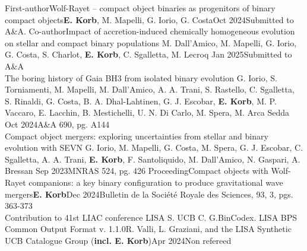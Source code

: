 %
%
%

\begin{experiences}
    \publicationtags
    {First-author}{Wolf-Rayet -- compact object binaries as progenitors of binary compact objects}{\textbf{E. Korb}, M. Mapelli, G. Iorio, G. Costa}{Oct 2024}{Submitted to A\&A.}{}
    \emptySeparator
    \publicationtags
    {Co-author}{Impact of accretion-induced chemically homogeneous evolution on stellar and compact binary populations}
    {M. Dall'Amico, M. Mapelli, G. Iorio, G. Costa, S. Charlot, \textbf{E. Korb}, C. Sgalletta, M. Lecroq}
    {Jan 2025}{Submitted to A\&A}
    {} 
    \\
    \medskip
    \publicationtags
    {}{The boring history of Gaia BH3 from isolated binary evolution}
    {G. Iorio, S. Torniamenti, M. Mapelli, M. Dall'Amico, A. A. Trani, S. Rastello, C. Sgalletta, S. Rinaldi, G. Costa, B. A. Dhal-Lahtinen, G. J. Escobar, \textbf{E. Korb}, M. P. Vaccaro, E. Lacchin, B. Mestichelli, U. N. Di Carlo, M. Spera, M. Arca Sedda}
    {Oct 2024}{A\&A 690, pg. A144}
    {} 
    \\
    \medskip
    \publicationtags
    {}{Compact object mergers: exploring uncertainties from stellar and binary evolution with SEVN}
    {G. Iorio, M. Mapelli, G. Costa, M. Spera, G. J. Escobar, C. Sgalletta, A. A. Trani, \textbf{E. Korb}, F. Santoliquido, M. Dall'Amico, N. Gaspari, A. Bressan}
    {Sep 2023}{MNRAS 524, pg. 426}
    {}    
    \emptySeparator
    \publicationtags
    {Proceeding}{Compact objects with Wolf-Rayet companions: a key binary configuration to produce gravitational wave mergers}{\textbf{E. Korb}}{Dec 2024}{Bulletin de la Société Royale des Sciences, 93, 3, pgs. 363-373 \\ Contribution to 41st LIAC conference}{}
    \emptySeparator
    \publicationtags
    {LISA S. UCB C. G.}{BinCodex. LISA BPS Common Output Format v. 1.1.0}{R. Valli, L. Graziani, and the LISA Synthetic UCB Catalogue Group (\textbf{incl. E. Korb})}{Apr 2024}{Non refereed}{}
\end{experiences}